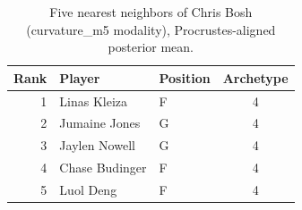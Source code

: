\begin{table}[htbp]
  \centering\small
  \begin{tabular}{rllc}
    \toprule
    Rank & Player & Position & Archetype \\
    \midrule
    1 & Linas Kleiza & F & 4 \\
    2 & Jumaine Jones & G & 4 \\
    3 & Jaylen Nowell & G & 4 \\
    4 & Chase Budinger & F & 4 \\
    5 & Luol Deng & F & 4 \\
    \bottomrule
  \end{tabular}
  \caption{Five nearest neighbors of Chris Bosh (curvature_m5 modality), Procrustes-aligned posterior mean.}
  \label{tab:Chris_Bosh_neighbors_curvature_m5}
\end{table}

